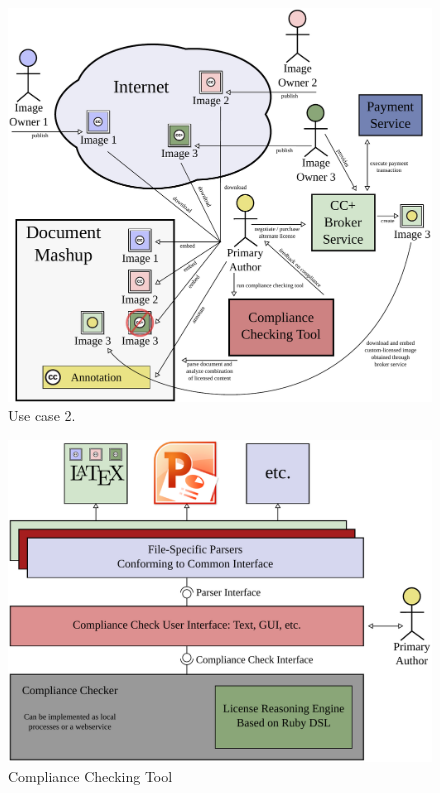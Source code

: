 \documentclass[botnum,fleqn,final]{unmeethesis}
\begin{document}
\begin{figure}[!htpb]
    \begin{center}
        \includegraphics[width=1.0\textwidth]{usecase2-full.pdf}
    \end{center}
  \caption[Use case 2]{Use case 2.}
  \label{fi:usecase2}
\end{figure}

\begin{figure}[!htpb]
    \begin{center}
            \includegraphics[width=1.0\textwidth]{compliance-checking-tool.pdf}
    \end{center}
    \caption[Compliance Checking Tool]{Compliance Checking Tool}
    \label{fi:complianceCheckingTool}
\end{figure}
\end{document}
